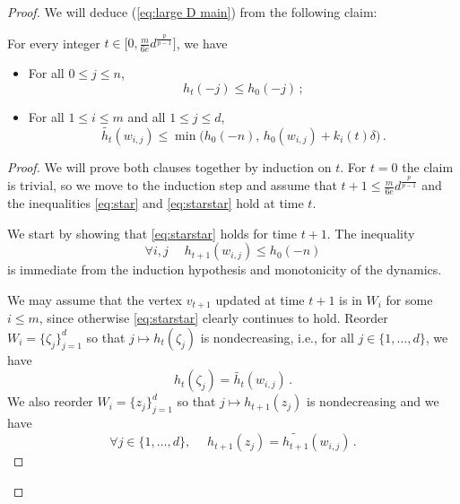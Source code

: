 \documentclass[10pt,a4paper]{amsart}
\begin{document}
\begin{proof}
We will deduce (\ref{eq:large D main}) from the following 
claim:
\begin{claim}
          For every integer $t\in \big[0, \frac{m}{6e}d^{\frac{p}{p-1}}\big]$, we have
    \begin{itemize}
        \item [(a)]
        For all $0\leq j\leq n$, 
\begin{equation}\label{eq:star}
            h_t(-j)\leq h_0(-j)  \, ;
        \end{equation}
        \item [(b)] For all $1\leq i\leq m$ and all $1\leq j\leq d$,
\begin{equation}\label{eq:starstar}
\widetilde{h_t}(w_{i,j})\leq \min\bigl(h_0(-n), \, h_0(w_{i,j})+k_i(t)\delta \bigr) \, .
\end{equation}        
    \end{itemize}
\end{claim}
\begin{proof}
    We will prove both clauses together by induction on $t$.  For $t=0$ the claim is trivial, so we move to the induction step and assume that $t+1 \le  \frac{m}{6e}d^{\frac{p}{p-1}}$ and the inequalities \eqref{eq:star} and \eqref{eq:starstar} hold at time $t$. 
    
    We start by showing that \eqref{eq:starstar} holds for time $t+1$. The inequality
    \begin{equation} \label{clear1}
     \forall i,j \quad  \; h_{t+1}(w_{i,j}) \le h_0(-n)  
    \end{equation}
    is immediate from the induction hypothesis and monotonicity of the dynamics. 
    
    We may assume that the vertex $v_{t+1}$ updated at time $t+1$ is in  $W_i$ for some $i \le m$, since otherwise \eqref{eq:starstar} clearly continues to hold.
    Reorder  $W_i=\{\zeta_j\}_{j=1}^d$ so that $j \mapsto h_{t}(\zeta_j)$ is nondecreasing, i.e., for all $j \in \{1,\ldots,d\}$, we have
    \begin{equation} \label{enumi0}
    h_{t}(\zeta_j)=\widetilde{h_{t}}(w_{i,j}) \,. 
    \end{equation} 
We also reorder  $W_i=\{z_j\}_{j=1}^d$ so that $j \mapsto h_{t+1}(z_j)$ is nondecreasing and  we have
    \begin{equation} \label{enumi}
    \forall j \in \{1,\ldots,d\}, \quad \;h_{t+1}(z_j)=\widetilde{h_{t+1}}(w_{i,j}) \,. 
    \end{equation} 
    

\end{proof}
\end{proof}
\end{document}
